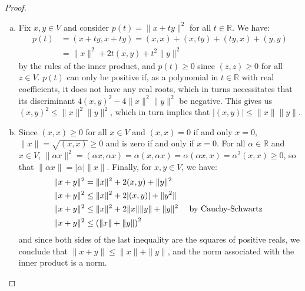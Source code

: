 \documentclass[11pt,a4paper,twoside]{article}
\theoremstyle{definition}
\begin{document}
\begin{proof}\hfill

  \begin{enumerate}[(a)]

  \item Fix $x, y \in V$ and consider $p (t) = \| x + t y \|^2$ for all $t \in \mathbb{R}$. We have:
    \begin{align*}
      p (t) &= (x + t y, x + t y) = (x, x) + (x, t y) + (t y, x) + (y, y) \\
      &= \| x \|^2 + 2 t (x, y) + t^2 \| y \|^2
    \end{align*}
    by the rules of the inner product, and $p (t) \geq 0$ since $(z, z) \geq 0$ for all $z \in V$.
    $p (t)$ can only be positive if, as a polynomial in $t \in \mathbb{R}$ with real coefficients, it does not have any real roots,
    which in turns necessitates that its discriminant $4 (x, y)^2 - 4 \| x \|^2 \| y \|^2$ be negative. This gives us $(x, y)^2 \leq \| x \|^2 \| y \|^2$,
    which in turn implies that $| (x, y) | \leq \| x \| \| y \|$.

  \item Since $(x, x) \geq 0$ for all $x \in V$ and $(x, x) = 0$ if and only $x = 0$, $\| x \| = \sqrt{(x, x)} \geq 0$ and is zero if and only if $x = 0$.
    For all $\alpha \in \mathbb{R}$ and $x \in V$, $\| \alpha x \|^2 = (\alpha x, \alpha x) = \alpha (x, \alpha x) = \alpha (\alpha x, x) = \alpha^2 (x, x) \geq 0$,
    so that $\| \alpha x \| = | \alpha | \| x \|$. Finally, for $x, y \in V$, we have:
    \begin{align*}
      \| x + y \|^2 &= \| x \|^2 + 2 (x, y) + \| y \|^2 \\
      \| x + y \|^2 &\leq \| x \|^2 + 2 | (x, y) | + \| y^2 \| \\
      \| x + y \|^2 &\leq \| x \|^2 + 2 \| x \| \| y \| + \| y \|^2 \text{ \quad by Cauchy-Schwartz } \\
      \| x + y \|^2 &\leq \left( \| x \| + \| y \| \right)^2
    \end{align*}
    and since both sides of the last inequality are the squares of positive reals, we conclude that $\| x + y \| \leq \| x \| + \| y \|$, and the norm associated with the inner product is a norm.

  \end{enumerate}

\end{proof}
\end{document}
